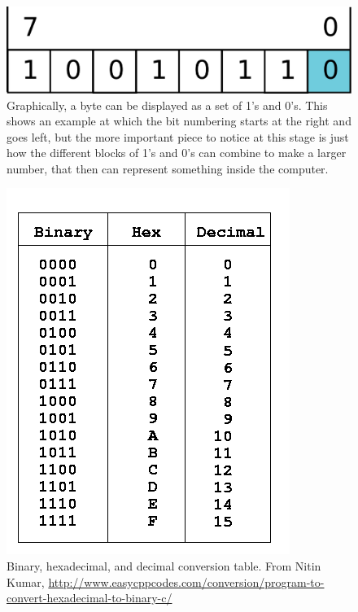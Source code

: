 \documentclass[a4paper,10pt]{scrartcl}
\begin{document}
\begin{figure}[h!]
\begin{center}
\includegraphics[width=.8\linewidth]{figures/Introduction/Lsb0.pdf}
\end{center}
\caption{Graphically, a byte can be displayed as a set of 1's and 0's. This shows an example at which the bit numbering starts at the right and goes left, but the more important piece to notice at this stage is just how the different blocks of 1's and 0's can combine to make a larger number, that then can represent something inside the computer.}
\end{figure}

\begin{figure}[h!]
 \begin{center}
 \includegraphics[width=.8\linewidth]{figures/Introduction/convert-hexadecimal-to-binary-C-.png}
 \end{center}
 \caption{Binary, hexadecimal, and decimal conversion table. From Nitin Kumar, \url{http://www.easycppcodes.com/conversion/program-to-convert-hexadecimal-to-binary-c/}}
\end{figure}
\end{document}
